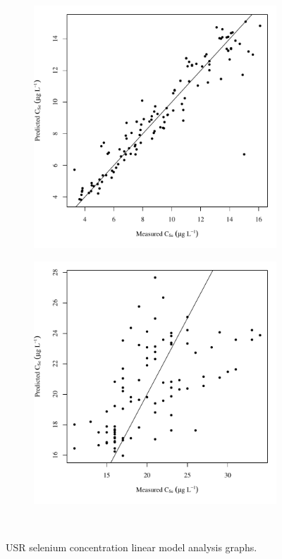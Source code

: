 \subfiguremid
\begin{landscape}
	\begin{figure}
		\begin{subfigure}{0.7\textwidth}
			\centering
			\includegraphics[width=\tableCustomSize]{"Figures/Results_USR/Stochastic/Conc Model pred v meas UDIV"}
		\end{subfigure}%
		\begin{subfigure}{0.7\textwidth}
			\centering
			\includegraphics[width=\tableCustomSize]{"Figures/Results_USR/Stochastic/Conc Model pred v meas WTP"}
		\end{subfigure}\\
		\caption{USR selenium concentration linear model analysis graphs.}
	\end{figure}
\end{landscape}

